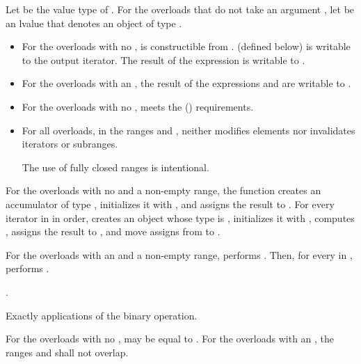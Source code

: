 \begin{itemdescr}
\pnum
Let  be the value type of .
For the overloads that do not take an argument ,
let  be an lvalue
that denotes an object of type .

\pnum
\mandates
\begin{itemize}
\item
  For the overloads with no ,
   is constructible from .
   (defined below) is
  writable
  to the  output iterator.
  The result of the expression 
  is writable to .
\item
  For the overloads with an ,
  the result of the expressions  and
   are writable to .
\end{itemize}

\pnum
\expects
\begin{itemize}
\item
  For the overloads with no ,
   meets the  ()
  requirements.
\item
  For all overloads, in the ranges 
  and ,
   neither modifies elements
  nor invalidates iterators or subranges.
\begin{footnote}
The use of fully closed ranges is intentional.
\end{footnote}
\end{itemize}

\pnum
\effects
For the overloads with no  and a non-empty range,
the function creates an accumulator  of type ,
initializes it with ,
and assigns the result to .
For every iterator  in  in order,
creates an object  whose type is ,
initializes it with ,
computes ,
assigns the result to , and
move assigns from  to .

\pnum
For the overloads with an  and a non-empty range,
performs .
Then, for every  in ,
performs .

\pnum
\returns
{}.

\pnum
\complexity
Exactly  applications of the binary operation.

\pnum
\remarks
For the overloads with no ,
 may be equal to .
For the overloads with an ,
the ranges  and 
shall not overlap.
\end{itemdescr}

